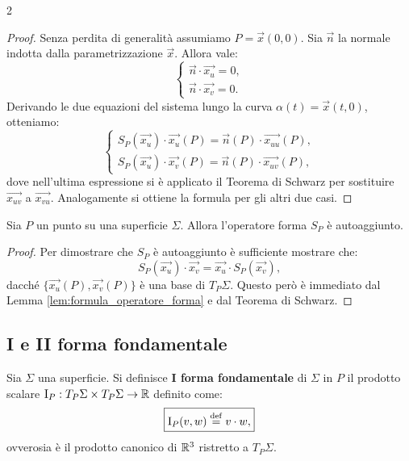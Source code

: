 \begin{multicols*}{2}
    \begin{proof}
        Senza perdita di generalità assumiamo $P = \vec{x}(0, 0)$.
        Sia $\vec{n}$ la normale indotta dalla parametrizzazione $\vec{x}$. Allora vale:
        \[
            \begin{cases}
                \vec{n} \cdot \vec{x_u} = 0, \\
                \vec{n} \cdot \vec{x_v} = 0.
            \end{cases}
        \]
        Derivando le due equazioni del sistema lungo la curva $\alpha(t) = \vec{x}(t, 0)$,
        otteniamo:
        \[
            \begin{cases}
                S_P(\vec{x_u}) \cdot \vec{x_u}(P) = \vec{n}(P) \cdot \vec{x_{uu}}(P), \\
                S_P(\vec{x_u}) \cdot \vec{x_v}(P) = \vec{n}(P) \cdot \vec{x_{uv}}(P),
            \end{cases}
        \]
        dove nell'ultima espressione si è applicato il Teorema di Schwarz per sostituire $\vec{x_{uv}}$
        a $\vec{x_{vu}}$. Analogamente si ottiene la formula per gli altri due casi.
    \end{proof}

    \begin{proposition} \label{prop:forma_autoaggiunta}
        Sia $P$ un punto su una superficie $\Sigma$. Allora l'operatore
        forma $S_P$ è autoaggiunto.
    \end{proposition}

    \begin{proof}
        Per dimostrare che $S_P$ è autoaggiunto è sufficiente mostrare
        che:
        \[ S_P(\vec{x_u}) \cdot \vec{x_v} = \vec{x_u} \cdot S_P(\vec{x_v}), \]
        dacché $\{\vec{x_u}(P), \vec{x_v}(P)\}$ è una base di $T_P \Sigma$. Questo
        però è immediato dal Lemma \ref{lem:formula_operatore_forma} e dal Teorema
        di Schwarz.
    \end{proof}

    \subsection{I e II forma fondamentale}

    \begin{definition}
        Sia $\Sigma$ una superficie. Si definisce \textbf{I forma fondamentale}
        di $\Sigma$ in $P$ il prodotto scalare $\mathrm{I}_P : T_P \Sigma \times T_P \Sigma \to \mathbb{R}$
        definito come:
        \[
            \boxed{\mathrm{I}_P(v, w) \overset{\mathrm{def}}{=} v \cdot w,}
        \]
        ovverosia è il prodotto canonico di $\mathbb{R}^3$ ristretto
        a $T_P \Sigma$.
    \end{definition}


\end{multicols*}
